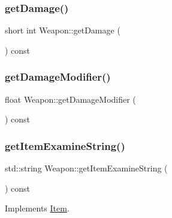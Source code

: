 \mbox{\label{class_weapon_adb39958d1bfe60371314991040ab04fd}} 
\subsubsection{\texorpdfstring{get\+Damage()}{getDamage()}}
{\footnotesize\ttfamily short int Weapon\+::get\+Damage (\begin{DoxyParamCaption}{ }\end{DoxyParamCaption}) const}

\mbox{\label{class_weapon_aa721632fc6af9548259814f4a4795757}} 
\subsubsection{\texorpdfstring{get\+Damage\+Modifier()}{getDamageModifier()}}
{\footnotesize\ttfamily float Weapon\+::get\+Damage\+Modifier (\begin{DoxyParamCaption}{ }\end{DoxyParamCaption}) const}

\mbox{\label{class_weapon_aa52cecf0a3c34aba70a6425c36d40afa}} 
\subsubsection{\texorpdfstring{get\+Item\+Examine\+String()}{getItemExamineString()}}
{\footnotesize\ttfamily std\+::string Weapon\+::get\+Item\+Examine\+String (\begin{DoxyParamCaption}{ }\end{DoxyParamCaption}) const\hspace{0.3cm}{\ttfamily [virtual]}}



Implements \mbox{\hyperlink{class_item_a00e06647e1adeb62f2d95044476126ac}{Item}}.

\mbox{\label{class_weapon_a726f5f0de9244b9e24e52407272cdf08}} 

